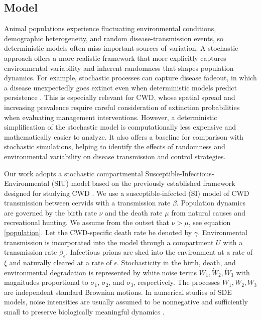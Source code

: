 \documentclass[12pt,a4paper,reqno]{amsart}
\theoremstyle{definition}
\theoremstyle{remark}
\theoremstyle{plain}
\begin{document}
\subsection{Model}
Animal populations experience fluctuating environmental conditions, demographic heterogeneity, and random disease-transmission events, so deterministic models often miss important sources of variation. A stochastic approach offers a more realistic framework that more explicitly captures environmental variability and inherent randomness that shapes population dynamics. For example, stochastic processes can capture disease fadeout, in which a disease unexpectedly goes extinct even when deterministic models predict persistence \cite{lambert2018demographic}. This is especially relevant for CWD, whose spatial spread and increasing prevalence require careful consideration of extinction probabilities when evaluating management interventions. However, a deterministic simplification of the stochastic model is computationally less expensive and mathematically easier to analyze. It also offers a baseline for comparison with stochastic simulations, helping to identify the effects of randomness and environmental variability on disease transmission and control strategies.

Our work adopts a stochastic compartmental Susceptible-Infectious-Environmental (SIU) model based on the previously established framework designed for studying CWD \cite{oraby2014modeling, oraby2016using, vasilyeva2015aggregation}. We use a susceptible-infected (SI) model of CWD transmission between cervids with a transmission rate $\beta$. Population dynamics are governed by the birth rate $\nu$ and the death rate $\mu$ from natural causes and recreational hunting. We assume from the outset that $\nu>\mu$, see equation \eqref{population}. Let the CWD-specific death rate be denoted by $\gamma$. Environmental transmission is incorporated into the model through a compartment $U$ with a transmission rate $\beta_e$. Infectious prions are shed into the environment at a rate of $\xi$ and naturally cleared at a rate of $\epsilon$. Stochasticity in the birth, death, and environmental degradation is represented by white noise terms $\dot W_{1},\dot W_{2},\dot W_{3}$ with magnitudes proportional to $\sigma_1$, $\sigma_2$, and $\sigma_3$, respectively. The processes $W_{1},W_{2},W_{3}$ are independent standard Brownian motions. In numerical studies of SDE models, noise intensities are usually assumed to be nonnegative and sufficiently small to preserve biologically meaningful dynamics \cite{gray2011stochastic}. 
\end{document}
